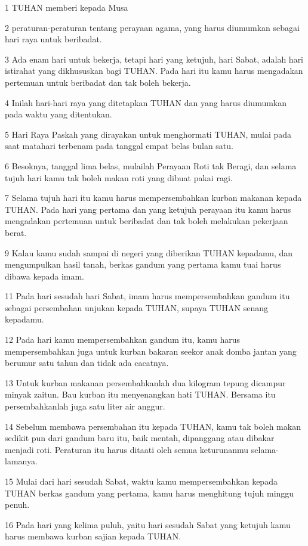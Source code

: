 \par 1 TUHAN memberi kepada Musa
\par 2 peraturan-peraturan tentang perayaan agama, yang harus diumumkan sebagai hari raya untuk beribadat.
\par 3 Ada enam hari untuk bekerja, tetapi hari yang ketujuh, hari Sabat, adalah hari istirahat yang dikhususkan bagi TUHAN. Pada hari itu kamu harus mengadakan pertemuan untuk beribadat dan tak boleh bekerja.
\par 4 Inilah hari-hari raya yang ditetapkan TUHAN dan yang harus diumumkan pada waktu yang ditentukan.
\par 5 Hari Raya Paskah yang dirayakan untuk menghormati TUHAN, mulai pada saat matahari terbenam pada tanggal empat belas bulan satu.
\par 6 Besoknya, tanggal lima belas, mulailah Perayaan Roti tak Beragi, dan selama tujuh hari kamu tak boleh makan roti yang dibuat pakai ragi.
\par 7 Selama tujuh hari itu kamu harus mempersembahkan kurban makanan kepada TUHAN. Pada hari yang pertama dan yang ketujuh perayaan itu kamu harus mengadakan pertemuan untuk beribadat dan tak boleh melakukan pekerjaan berat.
\par 9 Kalau kamu sudah sampai di negeri yang diberikan TUHAN kepadamu, dan mengumpulkan hasil tanah, berkas gandum yang pertama kamu tuai harus dibawa kepada imam.
\par 11 Pada hari sesudah hari Sabat, imam harus mempersembahkan gandum itu sebagai persembahan unjukan kepada TUHAN, supaya TUHAN senang kepadamu.
\par 12 Pada hari kamu mempersembahkan gandum itu, kamu harus mempersembahkan juga untuk kurban bakaran seekor anak domba jantan yang berumur satu tahun dan tidak ada cacatnya.
\par 13 Untuk kurban makanan persembahkanlah dua kilogram tepung dicampur minyak zaitun. Bau kurban itu menyenangkan hati TUHAN. Bersama itu persembahkanlah juga satu liter air anggur.
\par 14 Sebelum membawa persembahan itu kepada TUHAN, kamu tak boleh makan sedikit pun dari gandum baru itu, baik mentah, dipanggang atau dibakar menjadi roti. Peraturan itu harus ditaati oleh semua keturunanmu selama-lamanya.
\par 15 Mulai dari hari sesudah Sabat, waktu kamu mempersembahkan kepada TUHAN berkas gandum yang pertama, kamu harus menghitung tujuh minggu penuh.
\par 16 Pada hari yang kelima puluh, yaitu hari sesudah Sabat yang ketujuh kamu harus membawa kurban sajian kepada TUHAN.
